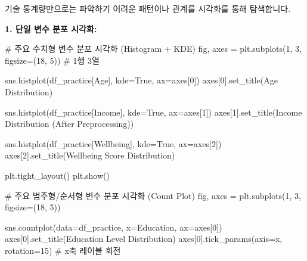 \documentclass[
  letterpaper,
]{book}
\newenvironment{Shaded}{\begin{snugshade}}{\end{snugshade}}
\newcommand{\CommentTok}[1]{\textcolor[rgb]{0.37,0.37,0.37}{#1}}
\newcommand{\DecValTok}[1]{\textcolor[rgb]{0.68,0.00,0.00}{#1}}
\newcommand{\NormalTok}[1]{\textcolor[rgb]{0.00,0.23,0.31}{#1}}
\newcommand{\OperatorTok}[1]{\textcolor[rgb]{0.37,0.37,0.37}{#1}}
\newcommand{\StringTok}[1]{\textcolor[rgb]{0.13,0.47,0.30}{#1}}
\newcommand{\VariableTok}[1]{\textcolor[rgb]{0.07,0.07,0.07}{#1}}
\begin{document}
기술 통계량만으로는 파악하기 어려운 패턴이나 관계를 시각화를 통해
탐색합니다.

\textbf{1. 단일 변수 분포 시각화:}

\begin{Shaded}
\begin{Highlighting}[]
\CommentTok{\# 주요 수치형 변수 분포 시각화 (Histogram + KDE)}
\NormalTok{fig, axes }\OperatorTok{=}\NormalTok{ plt.subplots(}\DecValTok{1}\NormalTok{, }\DecValTok{3}\NormalTok{, figsize}\OperatorTok{=}\NormalTok{(}\DecValTok{18}\NormalTok{, }\DecValTok{5}\NormalTok{)) }\CommentTok{\# 1행 3열}

\NormalTok{sns.histplot(df\_practice[}\StringTok{\textquotesingle{}Age\textquotesingle{}}\NormalTok{], kde}\OperatorTok{=}\VariableTok{True}\NormalTok{, ax}\OperatorTok{=}\NormalTok{axes[}\DecValTok{0}\NormalTok{])}
\NormalTok{axes[}\DecValTok{0}\NormalTok{].set\_title(}\StringTok{\textquotesingle{}Age Distribution\textquotesingle{}}\NormalTok{)}

\NormalTok{sns.histplot(df\_practice[}\StringTok{\textquotesingle{}Income\textquotesingle{}}\NormalTok{], kde}\OperatorTok{=}\VariableTok{True}\NormalTok{, ax}\OperatorTok{=}\NormalTok{axes[}\DecValTok{1}\NormalTok{])}
\NormalTok{axes[}\DecValTok{1}\NormalTok{].set\_title(}\StringTok{\textquotesingle{}Income Distribution (After Preprocessing)\textquotesingle{}}\NormalTok{)}

\NormalTok{sns.histplot(df\_practice[}\StringTok{\textquotesingle{}Wellbeing\textquotesingle{}}\NormalTok{], kde}\OperatorTok{=}\VariableTok{True}\NormalTok{, ax}\OperatorTok{=}\NormalTok{axes[}\DecValTok{2}\NormalTok{])}
\NormalTok{axes[}\DecValTok{2}\NormalTok{].set\_title(}\StringTok{\textquotesingle{}Wellbeing Score Distribution\textquotesingle{}}\NormalTok{)}

\NormalTok{plt.tight\_layout()}
\NormalTok{plt.show()}

\CommentTok{\# 주요 범주형/순서형 변수 분포 시각화 (Count Plot)}
\NormalTok{fig, axes }\OperatorTok{=}\NormalTok{ plt.subplots(}\DecValTok{1}\NormalTok{, }\DecValTok{3}\NormalTok{, figsize}\OperatorTok{=}\NormalTok{(}\DecValTok{18}\NormalTok{, }\DecValTok{5}\NormalTok{))}

\NormalTok{sns.countplot(data}\OperatorTok{=}\NormalTok{df\_practice, x}\OperatorTok{=}\StringTok{\textquotesingle{}Education\textquotesingle{}}\NormalTok{, ax}\OperatorTok{=}\NormalTok{axes[}\DecValTok{0}\NormalTok{])}
\NormalTok{axes[}\DecValTok{0}\NormalTok{].set\_title(}\StringTok{\textquotesingle{}Education Level Distribution\textquotesingle{}}\NormalTok{)}
\NormalTok{axes[}\DecValTok{0}\NormalTok{].tick\_params(axis}\OperatorTok{=}\StringTok{\textquotesingle{}x\textquotesingle{}}\NormalTok{, rotation}\OperatorTok{=}\DecValTok{15}\NormalTok{) }\CommentTok{\# x축 레이블 회전}


\end{Highlighting}
\end{Shaded}
\end{document}
